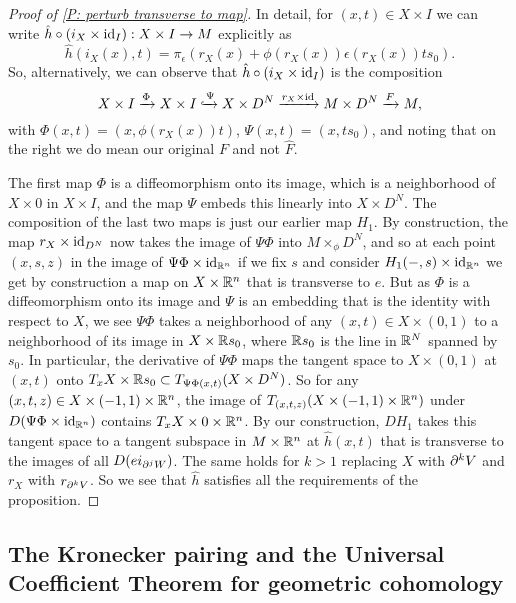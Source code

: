 \begin{proof}[Proof of \cref{P: perturb transverse to map}]
	In detail, for $(x,t) \in X \times I$ we can write $\hat h \circ (i_X \times \mathrm{id}_I):X \times I \to M$ explicitly as
	$$\hat h(i_X(x),t) = \pi_\epsilon(r_X(x)+\phi(r_X(x))\epsilon(r_X(x))ts_0).$$
	So, alternatively, we can observe that $\hat h \circ (i_X \times \mathrm{id}_I)$ is the composition
	\begin{equation}\label{E: alt hat g}
		X \times I \xrightarrow{\Phi} X \times I \xhookrightarrow{\Psi} X \times D^N \xrightarrow{r_X \times \mathrm{id}} M \times D^N \xrightarrow{F} M,
	\end{equation}
	with $\Phi(x,t) = (x,\phi(r_X(x))t)$, $\Psi(x,t) = (x,ts_0)$, and noting that on the right we do mean our original $F$ and not $\hat F$.

	The first map $\Phi$ is a diffeomorphism onto its image, which is a neighborhood of $X \times 0$ in $X \times I$, and the map $\Psi$ embeds this linearly into $X \times D^N$.
	The composition of the last two maps is just our earlier map $H_1$.
	By construction, the map $r_X \times \mathrm{id}_{D^N}$ now takes the image of $\Psi\Phi$ into $M\times_\phi D^N$, and so at each point $(x,s,z)$ in the image of $\Psi\Phi \times \mathrm{id}_{\mathbb{R}^n}$ if we fix $s$ and consider $H_1(-,s) \times \mathrm{id}_{\mathbb{R}^n}$ we get by construction a map on $X \times \mathbb{R}^n$ that is transverse to $e$.
	But as $\Phi$ is a diffeomorphism onto its image and $\Psi$ is an embedding that is the identity with respect to $X$, we see $\Psi\Phi$ takes a neighborhood of any $(x,t) \in X \times (0,1)$ to a neighborhood of its image in $X \times \mathbb{R} s_0$, where $\mathbb{R} s_0$ is the line in $\mathbb{R}^N$ spanned by $s_0$.
	In particular, the derivative of $\Psi\Phi$ maps the tangent space to $X \times (0,1)$ at $(x,t)$ onto $ T_xX \times \mathbb{R} s_0 \subset T_{\Psi\Phi(x,t)}(X \times D^N)$.
	So for any $(x,t,z) \in X \times (-1,1) \times \mathbb{R}^n$, the image of $T_{(x,t,z)}(X \times (-1,1) \times \mathbb{R}^n)$ under
	$D(\Psi\Phi \times \mathrm{id}_{\mathbb{R}^n})$ contains $T_xX \times 0 \times \mathbb{R}^n$.
	By our construction, $DH_1$ takes this tangent space to a tangent subspace in $M \times \mathbb{R}^n$ at $\hat h(x,t)$ that is transverse to the images of all $D(ei_{\partial^jW})$.
	The same holds for $k>1$ replacing $X$ with $\partial^{k}V$ and $r_X$ with $r_{\partial^{k}V}$.
	So we see that $\hat h$ satisfies all the requirements of the proposition.
\end{proof}

\subsection{The Kronecker pairing and the Universal Coefficient Theorem for geometric cohomology}

